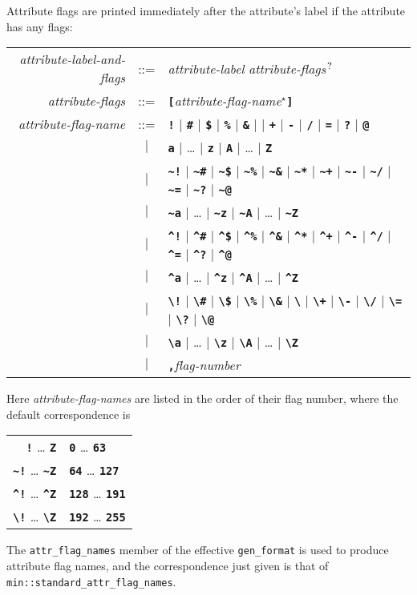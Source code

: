 \documentclass[12pt]{article}
\newcommand{\TT}[1]{{\tt \bfseries #1}}
\newcommand{\QMARK}{{$^{\,\mbox{\footnotesize ?}}$}}
\newcommand{\EOL}{\penalty \exhyphenpenalty}
\begin{document}
Attribute flags are printed immediately after the attribute's label
if the attribute has any flags:
\newcommand{\TTBS}[1]{\TT{\textbackslash#1}}
\begin{center}
\begin{tabular}{rcl}
{\em attribute-label-and-flags} & ::= & {\em attribute-label}
                                        {\em attribute-flags}\QMARK{} \\
{\em attribute-flags}
    & ::= & \TT{[}{\em attribute-flag-name}$^\star$\TT{]} \\
{\em attribute-flag-name} & ::= &
        \TT{!} $|$ \TT{\#} $|$ \TT{\$} $|$ \TT{\%} $|$ \TT{\&}
    $|$ \TT{*} $|$ \TT{+} $|$ \TT{-} $|$ \TT{/} $|$ \TT{=}
    $|$ \TT{?} $|$ \TT{@} \\
& $|$ & \TT{a} $|$ \ldots{} $|$ \TT{z} $|$ \TT{A} $|$ \ldots{} $|$ \TT{Z} \\
& $|$ & \TT{\~{ }!} $|$ \TT{\~{ }\#} $|$ \TT{\~{ }\$} $|$ \TT{\~{ }\%}
  $|$ \TT{\~{ }\&} $|$ \TT{\~{ }*} $|$ \TT{\~{ }+} $|$ \TT{\~{ }-}
  $|$ \TT{\~{ }/} $|$ \TT{\~{ }=} $|$ \TT{\~{ }?} $|$ \TT{\~{ }@} \\
& $|$ & \TT{\~{ }a} $|$ \ldots{} $|$ \TT{\~{ }z}
  $|$ \TT{\~{ }A} $|$ \ldots{} $|$ \TT{\~{ }Z} \\
& $|$ & \TT{\^{ }!} $|$ \TT{\^{ }\#} $|$ \TT{\^{ }\$} $|$ \TT{\^{ }\%}
  $|$ \TT{\^{ }\&} $|$ \TT{\^{ }*} $|$ \TT{\^{ }+} $|$ \TT{\^{ }-}
  $|$ \TT{\^{ }/} $|$ \TT{\^{ }=} $|$ \TT{\^{ }?} $|$ \TT{\^{ }@} \\
& $|$ & \TT{\^{ }a} $|$ \ldots{} $|$ \TT{\^{ }z} $|$ \TT{\^{ }A}
  $|$ \ldots{} $|$ \TT{\^{ }Z} \\
& $|$ & \TTBS{!} $|$ \TTBS{\#} $|$ \TTBS{\$} $|$ \TTBS{\%} $|$ \TTBS{\&}
  $|$ \TTBS{*} $|$ \TTBS{+} $|$ \TTBS{-} $|$ \TTBS{/} $|$ \TTBS{=}
  $|$ \TTBS{?} $|$ \TTBS{@} \\
& $|$ & \TTBS{a} $|$ \ldots{} $|$ \TTBS{z}
  $|$ \TTBS{A} $|$ \ldots{} $|$ \TTBS{Z} \\
& $|$ & \TT{,}{\em flag-number}
\end{tabular}
\end{center}

Here {\em attribute-flag-names} are listed in the order of their flag number,
where the default correspondence is
\begin{center}
\begin{tabular}{r@{~correspond to flag numbers~}l}
\TT{!} \ldots{} \TT{Z} & \TT{0} \ldots{} \TT{63} \\
\TT{\~{ }!} \ldots{} \TT{\~{ }Z} & \TT{64} \ldots{} \TT{127} \\
\TT{\^{ }!} \ldots{} \TT{\^{ }Z} & \TT{128} \ldots{} \TT{191} \\
\TTBS{!} \ldots{} \TTBS{Z} & \TT{192} \ldots{} \TT{255} \\
\end{tabular}
\end{center}
The {\tt attr\_flag\_names} member of the effective {\tt gen\_format}
is used to produce attribute flag names, and the correspondence just
given is that of {\tt min::\EOL standard\_\EOL attr\_\EOL flag\_\EOL names}.
\end{document}
